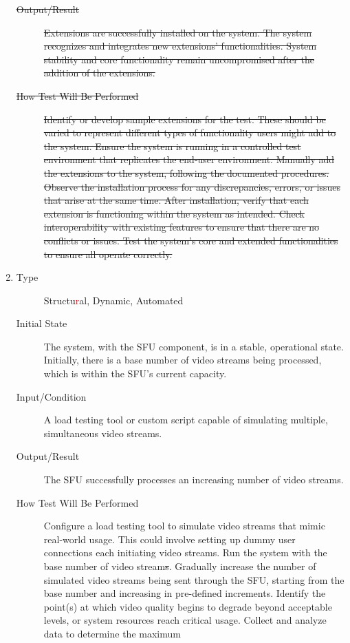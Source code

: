 \documentclass[12pt, titlepage]{article}
\newcommand{\rt}[1]{\textcolor{red}{#1}}
\begin{document}
\begin{enumerate}[NFR-T1]
\begin{description}
  \item[\sout{Output/Result}] \sout{Extensions are successfully installed on the system. The
    system recognizes and integrates new extensions' functionalities. System
    stability and core functionality remain uncompromised after the addition of
    the extensions.}
  \item[\sout{How Test Will Be Performed}] \sout{Identify or develop sample extensions for the
    test. These should be varied to represent different types of functionality
    users might add to the system. Ensure the system is running in a controlled
    test environment that replicates the end-user environment. Manually add the
    extensions to the system, following the documented procedures. Observe the
    installation process for any discrepancies, errors, or issues that arise at
    the same time. After installation, verify that each extension is functioning
    within the system as intended. Check interoperability with existing features
    to ensure that there are no conflicts or issues. Test the system's core and
    extended functionalities to ensure all operate correctly.}
  \end{description}
\item \label{NFRT6}
  \begin{description}
  \item[Type] Structu\rt{r}al, Dynamic, Automated
  \item[Initial State] The system, with the SFU component, is in a stable,
    operational state. Initially, there is a base number of video streams being
    processed, which is within the SFU's current capacity.
  \item[Input/Condition] A load testing tool or custom script capable of simulating
    multiple, simultaneous video streams.
  \item[Output/Result] The SFU successfully processes an increasing number of video
    streams.
  \item[How Test Will Be Performed] Configure a load testing tool to simulate video
    streams that mimic real-world usage. This could involve setting up dummy
    user connections each initiating video streams. Run the system with the base
    number of video stream\sout{s}. Gradually increase the number of simulated video
    streams being sent through the SFU, starting from the base number and
    increasing in pre-defined increments. Identify the point(s) at which video
    quality begins to degrade beyond acceptable levels, or system resources
    reach critical usage. Collect and analyze data to determine the maximum

\end{description}
\end{enumerate}
\end{document}
